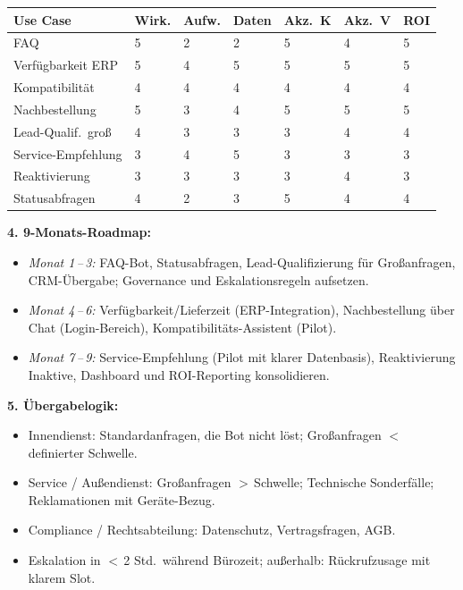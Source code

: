 \documentclass[11pt,a4paper,oneside]{article}
\begin{document}
\begin{loesungbox}
\smallskip
\begin{tabularx}{\linewidth}{@{}lXXXXXX@{}}
\toprule
\textbf{Use Case} & \textbf{Wirk.} & \textbf{Aufw.} & \textbf{Daten} & \textbf{Akz.\ K} & \textbf{Akz.\ V} & \textbf{ROI} \\
\midrule
FAQ                & 5 & 2 & 2 & 5 & 4 & 5 \\
Verfügbarkeit ERP  & 5 & 4 & 5 & 5 & 5 & 5 \\
Kompatibilität     & 4 & 4 & 4 & 4 & 4 & 4 \\
Nachbestellung     & 5 & 3 & 4 & 5 & 5 & 5 \\
Lead-Qualif.\ groß & 4 & 3 & 3 & 3 & 4 & 4 \\
Service-Empfehlung & 3 & 4 & 5 & 3 & 3 & 3 \\
Reaktivierung      & 3 & 3 & 3 & 3 & 4 & 3 \\
Statusabfragen     & 4 & 2 & 3 & 5 & 4 & 4 \\
\bottomrule
\end{tabularx}

\smallskip
\textbf{4. 9-Monats-Roadmap:}
\begin{itemize}
  \item \emph{Monat 1\,--\,3:} FAQ-Bot, Statusabfragen, Lead-Qualifizierung für Großanfragen, CRM-Übergabe; Governance und Eskalationsregeln aufsetzen.
  \item \emph{Monat 4\,--\,6:} Verfügbarkeit/Lieferzeit (ERP-Integration), Nachbestellung über Chat (Login-Bereich), Kompatibilitäts-Assistent (Pilot).
  \item \emph{Monat 7\,--\,9:} Service-Empfehlung (Pilot mit klarer Datenbasis), Reaktivierung Inaktive, Dashboard und ROI-Reporting konsolidieren.
\end{itemize}

\textbf{5. Übergabelogik:}
\begin{itemize}
  \item Innendienst: Standardanfragen, die Bot nicht löst; Großanfragen $<$\,definierter Schwelle.
  \item Service / Außendienst: Großanfragen $>$\,Schwelle; Technische Sonderfälle; Reklamationen mit Geräte-Bezug.
  \item Compliance / Rechtsabteilung: Datenschutz, Vertragsfragen, AGB.
  \item Eskalation in $<$\,2 Std.\ während Bürozeit; außerhalb: Rückrufzusage mit klarem Slot.
\end{itemize}


\end{loesungbox}
\end{document}
